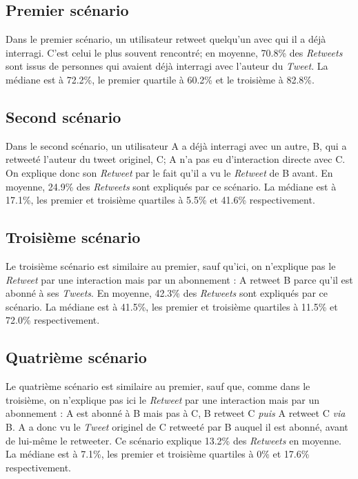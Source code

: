 \documentclass[]{article}
\begin{document}
\subsection{Premier scénario}

Dans le premier scénario, un utilisateur retweet quelqu'un avec qui il a
déjà interragi. C'est celui le plus souvent rencontré; en moyenne,
70.8\% des \emph{Retweets} sont issus de personnes qui avaient déjà
interragi avec l'auteur du \emph{Tweet}. La médiane est à 72.2\%, le
premier quartile à 60.2\% et le troisième à 82.8\%.

\subsection{Second scénario}

Dans le second scénario, un utilisateur A a déjà interragi avec un
autre, B, qui a retweeté l'auteur du tweet originel, C; A n'a pas eu
d'interaction directe avec C. On explique donc son \emph{Retweet} par le
fait qu'il a vu le \emph{Retweet} de B avant. En moyenne, 24.9\% des
\emph{Retweets} sont expliqués par ce scénario. La médiane est à 17.1\%,
les premier et troisième quartiles à 5.5\% et 41.6\% respectivement.

\subsection{Troisième scénario}

Le troisième scénario est similaire au premier, sauf qu'ici, on
n'explique pas le \emph{Retweet} par une interaction mais par un
abonnement : A retweet B parce qu'il est abonné à ses \emph{Tweets}. En
moyenne, 42.3\% des \emph{Retweets} sont expliqués par ce scénario. La
médiane est à 41.5\%, les premier et troisième quartiles à 11.5\% et
72.0\% respectivement.

\subsection{Quatrième scénario}

Le quatrième scénario est similaire au premier, sauf que, comme dans le
troisième, on n'explique pas ici le \emph{Retweet} par une interaction
mais par un abonnement : A est abonné à B mais pas à C, B retweet C
\emph{puis} A retweet C \emph{via} B. A a donc vu le \emph{Tweet}
originel de C retweeté par B auquel il est abonné, avant de lui-même le
retweeter. Ce scénario explique 13.2\% des \emph{Retweets} en moyenne.
La médiane est à 7.1\%, les premier et troisième quartiles à 0\% et
17.6\% respectivement.
\end{document}
